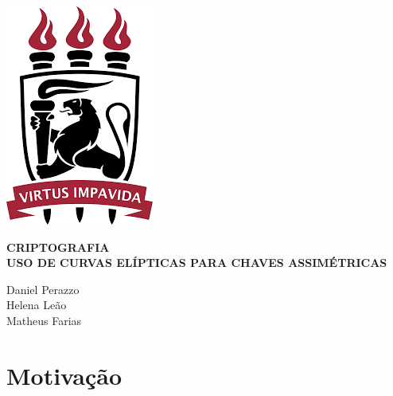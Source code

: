 \documentclass[14pt, oneside]{book}
\date{\vspace{-5ex}}
\theoremstyle{definition}
\begin{document}

\begin{titlepage}
   \includegraphics[scale = 0.6]{ufpe.png} \centering
   \begin{center}
        \Huge\textbf{CRIPTOGRAFIA}\\
        \Large\textbf{USO DE CURVAS ELÍPTICAS PARA CHAVES ASSIMÉTRICAS}
   \end{center}
   \vfill
        \begin{center}
            \Large{Daniel Perazzo} \\
            \Large{Helena Leão} \\
            \Large{Matheus Farias}
        \end{center}
\end{titlepage}
    
   
\tableofcontents
\mainmatter
        \chapter{Motivação}
\end{document}
